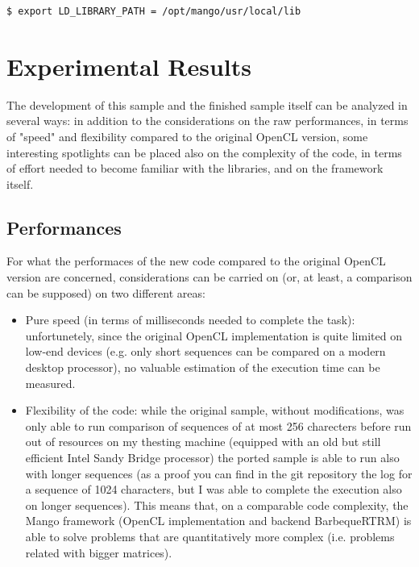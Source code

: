 \begin{lstlisting}[language=bash]
      $ export LD_LIBRARY_PATH = /opt/mango/usr/local/lib
\end{lstlisting}

\section{Experimental Results}

The development of this sample and the finished sample itself can be analyzed in several ways: in addition to the considerations on the raw performances, in terms of "speed" and flexibility compared to the original OpenCL version, some interesting spotlights can be placed also on the complexity of the code, in terms of effort needed to become familiar with the libraries, and on the framework itself.

\subsection{Performances}
For what the performaces of the new code compared to the original OpenCL version are concerned, considerations can be carried on (or, at least, a comparison can be supposed) on two different areas:
\begin{itemize}
      \item Pure speed (in terms of milliseconds needed to complete the task): unfortunetely, since the original OpenCL implementation is quite limited on low-end devices (e.g. only short sequences can be compared on a modern desktop processor), no valuable estimation of the execution time can be measured.
      \item Flexibility of the code: while the original sample, without modifications, was only able to run comparison of sequences of at most 256 charecters before run out of resources on my thesting machine (equipped with an old but still efficient Intel Sandy Bridge processor) the ported sample is able to run also with longer sequences (as a proof you can find in the git repository\cite{github} the log for a sequence of 1024 characters, but I was able to complete the execution also on longer sequences). This means that, on a comparable code complexity, the Mango framework (OpenCL implementation and backend BarbequeRTRM) is able to solve problems that are quantitatively more complex (i.e. problems related with bigger matrices).
\end{itemize}


